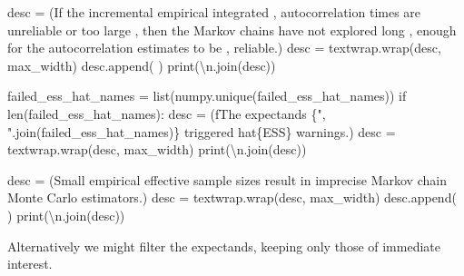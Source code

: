\documentclass[
  letterpaper,
  DIV=11,
  numbers=noendperiod]{scrartcl}
\newenvironment{Shaded}{\begin{snugshade}}{\end{snugshade}}
\newcommand{\BuiltInTok}[1]{\textcolor[rgb]{0.00,0.23,0.31}{#1}}
\newcommand{\CharTok}[1]{\textcolor[rgb]{0.13,0.47,0.30}{#1}}
\newcommand{\ControlFlowTok}[1]{\textcolor[rgb]{0.00,0.23,0.31}{#1}}
\newcommand{\NormalTok}[1]{\textcolor[rgb]{0.00,0.23,0.31}{#1}}
\newcommand{\OperatorTok}[1]{\textcolor[rgb]{0.37,0.37,0.37}{#1}}
\newcommand{\SpecialCharTok}[1]{\textcolor[rgb]{0.37,0.37,0.37}{#1}}
\newcommand{\SpecialStringTok}[1]{\textcolor[rgb]{0.13,0.47,0.30}{#1}}
\newcommand{\StringTok}[1]{\textcolor[rgb]{0.13,0.47,0.30}{#1}}
\begin{document}
\begin{Shaded}
\begin{Highlighting}[]
\NormalTok{    desc }\OperatorTok{=}\NormalTok{ (}\StringTok{\textquotesingle{}If the incremental empirical integrated \textquotesingle{}}\NormalTok{,}
            \StringTok{\textquotesingle{}autocorrelation times are unreliable or too large \textquotesingle{}}\NormalTok{,}
            \StringTok{\textquotesingle{}then the Markov chains have not explored long \textquotesingle{}}\NormalTok{,}
            \StringTok{\textquotesingle{}enough for the autocorrelation estimates to be \textquotesingle{}}\NormalTok{,}
            \StringTok{\textquotesingle{}reliable.\textquotesingle{}}\NormalTok{)}
\NormalTok{    desc }\OperatorTok{=}\NormalTok{ textwrap.wrap(desc, max\_width)}
\NormalTok{    desc.append(}\StringTok{\textquotesingle{} \textquotesingle{}}\NormalTok{)}
    \BuiltInTok{print}\NormalTok{(}\StringTok{\textquotesingle{}}\CharTok{\textbackslash{}n}\StringTok{\textquotesingle{}}\NormalTok{.join(desc))}

\NormalTok{  failed\_ess\_hat\_names }\OperatorTok{=} \BuiltInTok{list}\NormalTok{(numpy.unique(failed\_ess\_hat\_names))}
  \ControlFlowTok{if} \BuiltInTok{len}\NormalTok{(failed\_ess\_hat\_names):}
\NormalTok{    desc }\OperatorTok{=}\NormalTok{ (}\SpecialStringTok{f\textquotesingle{}The expectands }\SpecialCharTok{\{}\StringTok{", "}\SpecialCharTok{.}\NormalTok{join(failed\_ess\_hat\_names)}\SpecialCharTok{\}}\SpecialStringTok{ \textquotesingle{}}
             \StringTok{\textquotesingle{}triggered hat}\SpecialCharTok{\{ESS\}}\StringTok{ warnings.\textquotesingle{}}\NormalTok{)}
\NormalTok{    desc }\OperatorTok{=}\NormalTok{ textwrap.wrap(desc, max\_width)}
    \BuiltInTok{print}\NormalTok{(}\StringTok{\textquotesingle{}}\CharTok{\textbackslash{}n}\StringTok{\textquotesingle{}}\NormalTok{.join(desc))}

\NormalTok{    desc }\OperatorTok{=}\NormalTok{ (}\StringTok{\textquotesingle{}Small empirical effective sample sizes result in \textquotesingle{}}
            \StringTok{\textquotesingle{}imprecise Markov chain Monte Carlo estimators.\textquotesingle{}}\NormalTok{)}
\NormalTok{    desc }\OperatorTok{=}\NormalTok{ textwrap.wrap(desc, max\_width)}
\NormalTok{    desc.append(}\StringTok{\textquotesingle{} \textquotesingle{}}\NormalTok{)}
    \BuiltInTok{print}\NormalTok{(}\StringTok{\textquotesingle{}}\CharTok{\textbackslash{}n}\StringTok{\textquotesingle{}}\NormalTok{.join(desc))}
\end{Highlighting}
\end{Shaded}

Alternatively we might filter the expectands, keeping only those of
immediate interest.
\end{document}
